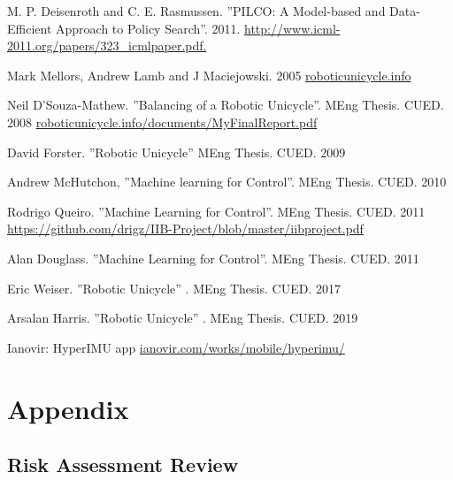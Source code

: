 \documentclass[twoside,twocolumn,12pt]{article}
\begin{document}

\clearpage
\begin{thebibliography}{9}
M. P. Deisenroth and C. E. Rasmussen. ''PILCO: A Model-based and Data-Efficient Approach to Policy Search''.
2011. \url{http://www.icml-2011.org/papers/323_icmlpaper.pdf.}

Mark Mellors, Andrew Lamb and J Maciejowski. 2005 \url{roboticunicycle.info} 

Neil D'Souza-Mathew. ''Balancing of a Robotic Unicycle''. MEng Thesis. CUED. 2008 \url{roboticunicycle.info/documents/MyFinalReport.pdf}

David Forster. ''Robotic Unicycle'' MEng Thesis. CUED. 2009

Andrew McHutchon, ''Machine learning for Control''. MEng Thesis. CUED. 2010

Rodrigo Queiro. ''Machine Learning for Control''. MEng Thesis. CUED. 2011
\url{https://github.com/drigz/IIB-Project/blob/master/iibproject.pdf}

Alan Douglass. ''Machine Learning for Control''. MEng Thesis. CUED. 2011

Eric Weiser. ''Robotic Unicycle'' . MEng Thesis. CUED. 2017

Arsalan Harris. ''Robotic Unicycle'' . MEng Thesis. CUED. 2019
 
 
Ianovir: HyperIMU app 
\url{ianovir.com/works/mobile/hyperimu/}

\end{thebibliography}



\clearpage
\section{Appendix}
\subsection{Risk Assessment Review}





\end{document}
